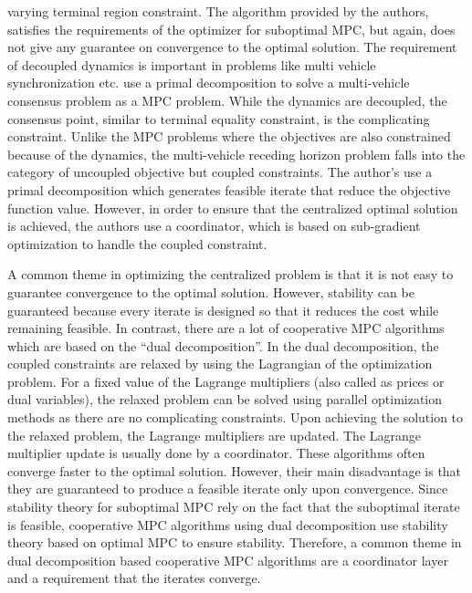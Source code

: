 varying terminal region constraint. The algorithm provided by the
authors, satisfies the requirements of the optimizer for suboptimal
MPC, but again, does not give any  guarantee on convergence to the
optimal solution. The
requirement of decoupled dynamics is important in problems like multi
vehicle synchronization
etc. \citet{johansson:speranzon:johansson:johansson:2006} use a primal
decomposition to solve a multi-vehicle consensus problem as a MPC
problem. While the dynamics are decoupled, the consensus point,
similar to terminal equality constraint, is the complicating
constraint. Unlike the MPC problems where the objectives are also
constrained because of the dynamics, the multi-vehicle receding
horizon problem falls into the category of uncoupled objective but
coupled constraints. The author's use a primal decomposition which
generates feasible iterate that reduce the objective function
value. However, in order to ensure that the centralized optimal
solution is achieved, the authors use a coordinator, which is based on
sub-gradient optimization to handle the coupled constraint.

A common theme in optimizing the centralized  problem is
that it is not easy to guarantee convergence to the optimal
solution. However, stability can be guaranteed because every iterate
is designed so that it reduces the cost while remaining feasible. In
contrast, there are a lot of cooperative MPC algorithms which are
based on the ``dual decomposition''. In the dual decomposition, the
coupled constraints are relaxed by using the Lagrangian of the
optimization problem. For a fixed value of the Lagrange multipliers
(also called as prices or dual variables), the relaxed problem can be solved using
parallel optimization methods as there are no complicating
constraints. Upon achieving the solution to the relaxed problem, the
Lagrange multipliers are updated. The Lagrange multiplier update is
usually done by a coordinator. These algorithms often converge faster
to the optimal solution. However, their main disadvantage is that they
are guaranteed to produce a feasible iterate only upon
convergence. Since stability theory for suboptimal MPC rely on the
fact that the suboptimal iterate is feasible, cooperative MPC
algorithms using dual decomposition use stability theory based on
optimal MPC to ensure stability. Therefore, a common theme in dual
decomposition based cooperative MPC algorithms are a coordinator layer
and a requirement that the iterates converge. 


